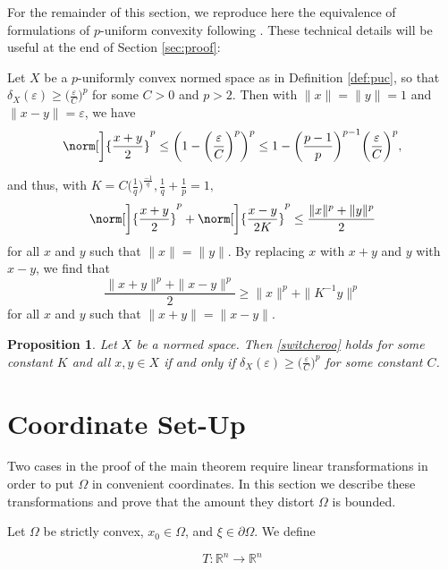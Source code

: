 \documentclass[letterpaper, 11pt, reqno]{amsart}
\newcommand\R{{\mathbb R}}
\newtheorem{prop}[thm]{Proposition}
\theoremstyle{definition}
\begin{document}
For the remainder of this section, we reproduce here the equivalence of formulations of $p$-uniform convexity following \cite{BCL}. These technical details will be useful at the end of Section \ref{sec:proof}:

Let $X$ be a $p$-uniformly convex normed space as in Definition \ref{def:puc}, so that $\delta_X(\varepsilon) \geq \big(\frac{\varepsilon}{C}\big)^p$ for some $C > 0$ and $p>2$. Then with $\|x\|=\|y\|=1$ and $\|x-y\|=\varepsilon$, we have
\begin{equation}
    \norm[\bigg]{ \frac{x+y}{2} }^p \leq \bigg( 1-\bigg(\frac{\varepsilon}{C}\bigg)^p\bigg)^p \leq 1 - \bigg(\frac{p-1}{p}\bigg)^{p-1}\bigg(\frac{\varepsilon}{C}\bigg)^p,
\end{equation}

and thus, with $K=C\big(\frac{1}{q}\big)^{\frac{-1}{q}}, \frac{1}{q}+\frac{1}{p}=1,$
\begin{equation}\label{switcheroo}
   \norm[\bigg] { \frac{x+y}{2} }^p+ \norm[\bigg]{\frac{x-y}{2K}}^p \leq \frac{\|x\|^p+\|y\|^p}{2}
\end{equation}
for all $x$ and $y$ such that $\|x\|=\|y\|$. By replacing $x$ with $x+y$ and $y$ with $x-y$, we find that
\begin{equation}
    \frac{\|x+y\|^p + \|x-y\|^p}{2} \geq \|x\|^p + \|K^{-1}y\|^p
\end{equation}
for all $x$ and $y$ such that $\|x+y\|=\|x-y\|$.

\begin{prop}{\cite{BCL}}\label{switcheroo_prop}
    Let $X$ be a normed space. Then \ref{switcheroo} holds for some constant $K$ and all $x,y \in X$ if and only if $\delta_X(\varepsilon) \geq \big(\frac{\varepsilon}{C}\big)^p$ for some constant $C$.
\end{prop}
\section{Coordinate Set-Up}\label{sec:setup}

Two cases in the proof of the main theorem require linear transformations in order to put $\Omega$ in convenient coordinates. In this section we describe these transformations and prove that the amount they distort $\Omega$ is bounded.

Let $\Omega$ be strictly convex, $x_0 \in \Omega$, and $\xi \in \partial \Omega$. We define

\begin{equation*}
    T: \R^n \longrightarrow \R^n
\end{equation*}
\end{document}

